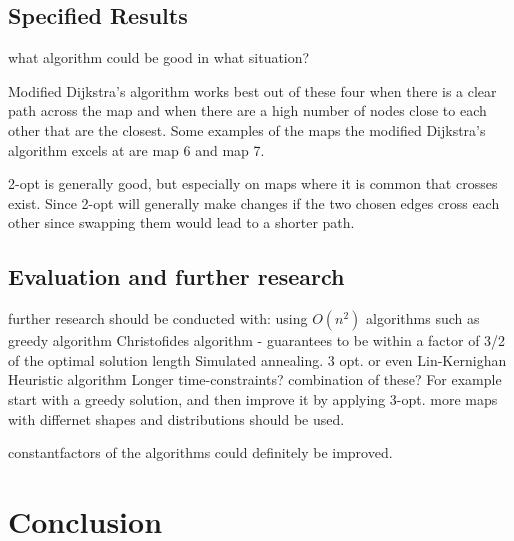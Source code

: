 \documentclass{article}
\begin{document}
\subsection{Specified Results }\label{subsec2}
what algorithm could be good in what situation?

Modified Dijkstra's algorithm works best out of these four when there is a clear path across the map and when there are a high number of nodes close to each other that are the closest. Some examples of the maps the modified Dijkstra's algorithm excels at are map 6 and map 7. 

2-opt is generally good, but especially on maps where it is common that crosses exist. Since 2-opt will generally make changes if the two chosen edges cross each other since swapping them would lead to a shorter path.


\subsection{Evaluation and further research}\label{subsec3}

further research should be conducted with:
using $O(n^2)$ algorithms such as 
greedy algorithm
Christofides algorithm - guarantees to be within a factor of 3/2 of the optimal solution length \cite{Christofides}
Simulated annealing.
3 opt. or even Lin-Kernighan Heuristic algorithm
Longer time-constraints?
combination of these? For example start with a greedy solution, and then improve it by applying 3-opt.
more maps with differnet shapes and distributions should be used.

constantfactors of the algorithms could definitely be improved.
\section{Conclusion}\label{sec5}






\newpage

 \label{sec6}


\newpage
\end{document}
